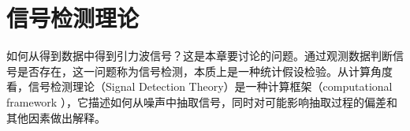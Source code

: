 \begin{comment}
由{\bfseries{Parseval}}定理可知：信号能量守恒，${\int^{\infty}_{-\infty}x^2(t)dt}\ =\ {\int^{\infty}_{-\infty}|x(f)|^2df}$\ ，由$\ref{td}$\ 得到$\ref{fd}$\ ; 且傅里叶变换是关于实数域的偶函数，即$\tilde{x}(-f)=\tilde{x}^*(f)$\ ，因而由$\ref{fd}$\  得到$\ref{ft}$\ ；由功率谱函数的定义：
\begin{equation}
\     \  S_x(\omega)\  :=\  \lim\limits_{T \to \infty }{\frac{1}{2 \pi T}|\tilde{x}(\omega)|^2}.
\end{equation}
\ $\  \tilde{}\   $\ 代表傅里叶变换，$\tilde{x}\ =\ \int^{T}_{0} dt\ x(t)e^{-j\omega t} $,由傅里叶变换的性质，也可得：$S_x(-\omega) = S_x{(\omega)}$
则由$\ref{ft}$\  得到$\ref{sw}$\

即：
\begin{align}
  \left \langle x^2 \right \rangle &=\  \lim\limits_{T \to \infty }{\frac{1}{2T}\int^{T}_{-T}x^2(t)dt}\label{td}        \\
             &=\  \lim\limits_{T \to \infty }{\frac{1}{2T}\int^{T}_{-T}|\tilde{x}(f)|^2df}\label{fd} \\
             &=\  \lim\limits_{T \to \infty }{\frac{1}{T}\int^{T}_{0}|\tilde{x}(f)|^2df} \label{ft} \\
             &=\   {\int^{\infty}_{0}S_x(f)}df  \label{sw}
\end{align}

$|x(f)|^2df$频率在$f$ 和 $f+df$内$x(t)$的分量对总能量的贡献。$\tilde{x}(f)^2$ 表示某频率$f$处的能量密度。

~\\
{\bfseries{ 自相关函数(Autocorrelation Function)}}

自相关函数的定义是：$R_x(\tau)\  :=\  \left \langle x(t)x(t+\tau )  \right \rangle$。
由$\bf{Wiener-Khinchin}$ 定理知，功率谱密度函数是自相关函数的的傅里叶变换，即
\begin{align}
\    &S_x(\omega) = \int^{\infty}_{-\infty} R_x(\tau) e^{-j\omega t} d\tau \\
\    &R_x(\tau) = \frac{1}{2 \pi}\int^{\infty}_{-\infty} S_x(\omega) e^{j\omega \tau} d\omega
\end{align}

自相关函数反映信号的周期性，功率谱密度反映信号在各个频率上的能量。白噪声是在整个频谱上能量不变的信号，即一条平行于X轴的直线，更具傅里叶变换的性质，其傅里叶反变换（信号的自相关函数）是狄拉克函数，即冲击函数。
\end{comment}

\section{信号检测理论}
如何从得到数据中得到引力波信号？这是本章要讨论的问题。通过观测数据判断信号是否存在，这一问题称为信号检测，本质上是一种统计假设检验。从计算角度看，信号检测理论（Signal Detection Theory）是一种计算框架（computational framework ），它描述如何从噪声中抽取信号，同时对可能影响抽取过程的偏差和其他因素做出解释。

